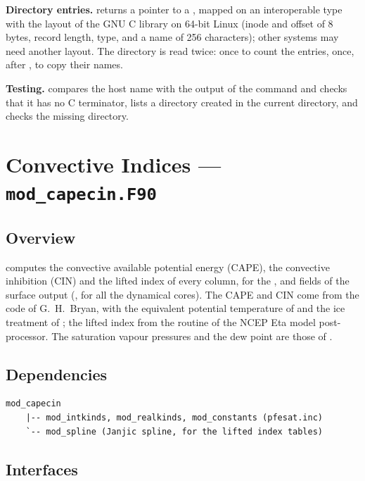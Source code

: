 \textbf{Directory entries.}  returns a pointer to a
, mapped on an interoperable type with the layout of
the GNU C library on 64-bit Linux (inode and offset of 8 bytes, record
length, type, and a name of 256 characters); other systems may need
another layout. The directory is read twice: once to count the entries,
once, after , to copy their names.

\textbf{Testing.}  compares the host
name with the output of the  command and checks that it has
no C terminator, lists a directory created in the current directory, and
checks the missing directory.

\section{Convective Indices --- \texttt{mod\_capecin.F90}}
\label{sec:capecin}

\subsection{Overview}

 computes the convective available potential energy
(CAPE), the convective inhibition (CIN) and the lifted index of every
column, for the ,  and  fields of the surface
output (, for all the dynamical cores). The CAPE and CIN
come from the  code of G.~H.~Bryan, with the equivalent
potential temperature of \citet{bolton1980} and the ice treatment of
\citet{bryan2004}; the lifted index from the  routine of the
NCEP Eta model post-processor. The saturation vapour pressures and the dew
point are those of .

\subsection{Dependencies}

\begin{lstlisting}
mod_capecin
    |-- mod_intkinds, mod_realkinds, mod_constants (pfesat.inc)
    `-- mod_spline (Janjic spline, for the lifted index tables)
\end{lstlisting}

\subsection{Interfaces}


